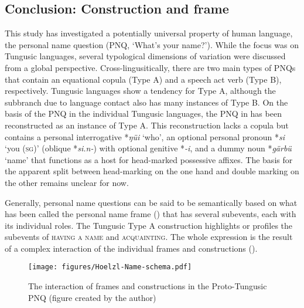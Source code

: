 \documentclass[output=paper,colorlinks,citecolor=brown]{langscibook}
\begin{document}
\subsection{Conclusion: Construction and frame}\label{section4.5.2}

This study has investigated a potentially universal property of human language, the personal name question (PNQ, ‘What’s your name?’). While the focus was on Tungusic languages, several typological dimensions of variation were discussed from a global perspective. Cross-lingusitically, there are two main types of PNQs that contain an equational copula (Type A) and a speech act verb (Type B), respectively. Tungusic languages show a tendency for Type A, although the  subbranch due to language contact also has many instances of Type B. On the basis of the PNQ in the individual Tungusic languages, the PNQ in  has been reconstructed as an instance of Type A. This reconstruction lacks a copula but contains a personal interrogative *\textit{ŋüi} ‘who’, an optional personal pronoun *\textit{si} ‘you (\textsc{sg})’ (oblique *\textit{si.n-}) with optional genitive *\textit{-i}, and a dummy noun *\textit{gärbü} ‘name’ that functions as a host for head-marked possessive affixes. The basis for the apparent split between head-marking on the one hand and double marking on the other remains unclear for now.

Generally, personal name questions can be said to be semantically based on what has been called the personal name frame () that has several subevents, each with its individual roles. The Tungusic Type A construction highlights or profiles the subevents of \textsc{having a name} and \textsc{acquainting}. The whole expression is the result of a complex interaction of the individual frames and constructions ().

\begin{figure}
\texttt{[image: figures/Hoelzl-Name-schema.pdf]}
\caption{The interaction of frames and constructions in the Proto-Tungusic PNQ (figure created by the author)}
\label{fig:4:1}
\end{figure}



\end{document}
